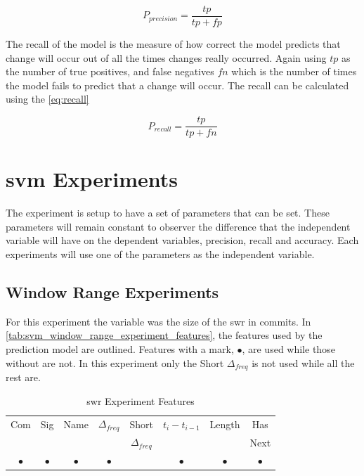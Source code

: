 \begin{equation} 
\label{eq:precision}
P_{precision} = \frac{tp}{tp+fp}
\end{equation}

The recall of the model is the measure of how correct the model predicts that change will occur out of all the times changes really occurred. Again using $tp$ as the number of true positives, and false negatives $fn$ which is the number of times the model fails to predict that a change will occur. The recall can be calculated using the \autoref{eq:recall}

\begin{equation} 
\label{eq:recall}
P_{recall} = \frac{tp}{tp+fn}
\end{equation}

\section{\gls{svm} Experiments}
\label{sec:svm_experiments}

The experiment is setup to have a set of parameters that can be set. These parameters will remain constant to observer the difference that the independent variable will have on the dependent variables, precision, recall and accuracy. Each experiments will use one of the parameters as the independent variable. 

\subsection{Window Range Experiments}


For this experiment the variable was the size of the \gls{swr} in commits. In \autoref{tab:svm_window_range_experiment_features}, the features used by the prediction model are outlined. Features with a mark, $\bullet$, are used while those without are not. In this experiment only the Short $\Delta_{freq}$ is not used while all the rest are.

\begin{table}[h]
\begin{center}

    \begin{tabular}{|c|c|c|c|c|c|c|c|}
        \hline
        Com & Sig & Name & $\Delta_{freq}$ & Short & $t_{i} - t_{i-1}$ & Length & Has \\
         & & & & $\Delta_{freq}$ & & & Next \\ \hline
        $\bullet$ & $\bullet$ & $\bullet$ & $\bullet$ & & $\bullet$ & $\bullet$ & $\bullet$ \\ \hline
    \end{tabular}
    \caption{\gls{swr} Experiment Features}
    \label{tab:svm_window_range_experiment_features}
\end{center}

\end{table}

